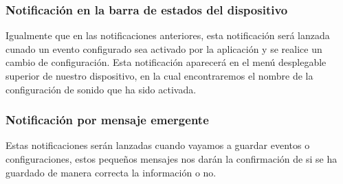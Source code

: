 \subsubsection{Notificación en la barra de estados del dispositivo}
Igualmente que en las notificaciones anteriores, esta notificación será lanzada cunado un evento configurado sea activado por la aplicación y se realice un cambio de configuración. Esta notificación aparecerá en el menú desplegable superior de nuestro dispositivo, en la cual encontraremos el nombre de la configuración de sonido que ha sido activada.
\subsubsection{Notificación por mensaje emergente}
Estas notificaciones serán lanzadas cuando vayamos a guardar eventos o configuraciones, estos pequeños mensajes nos darán la confirmación de si se ha guardado de manera correcta la información o no.
